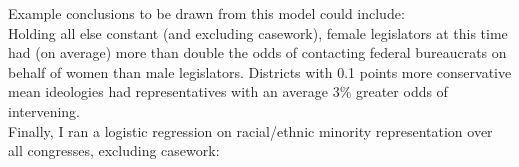 \documentclass[12pt,letterpaper]{article}
\begin{document}
	Example conclusions to be drawn from this model could include:\\
	
	Holding all else constant (and excluding casework), female legislators at this time had (on average) more than double the odds of contacting federal bureaucrats on behalf of women than male legislators. Districts with 0.1 points more conservative mean ideologies had representatives with an average 3\% greater odds of intervening.\\
	
	Finally, I ran a logistic regression on racial/ethnic minority representation over all congresses, excluding casework:\\
	
	
	
\end{document}
